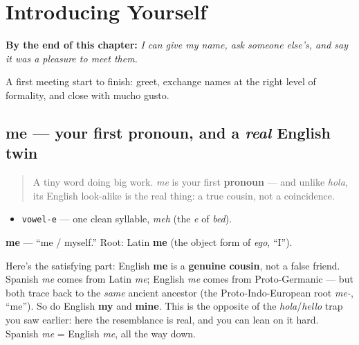 
\chapter{Introducing Yourself}
\label{ch:introductions}

\begin{chapteropening}
\textbf{By the end of this chapter:} \emph{I can give my name, ask someone else's, and say it was a pleasure to meet them.}

A first meeting start to finish: greet, exchange names at the right level of formality, and close with mucho gusto.
\end{chapteropening}

\section[me]{me — your first pronoun, and a \emph{real} English twin}

\label{lesson:ES-C03-me}



\begin{quote}
A tiny word doing big work. \emph{me} is your first \textbf{pronoun} — and unlike \emph{hola}, its English look-alike is the real thing: a true cousin, not a coincidence.
\end{quote}

\begin{sounds}
\begin{itemize}
\raggedright
  \item \texttt{vowel-e} — one clean syllable, \emph{meh} (the \emph{e} of \emph{bed}).
\end{itemize}
\end{sounds}

\begin{cousinweb}
\textbf{me} — \textquotedblleft{}me / myself.\textquotedblright{} Root: Latin \textbf{me} (the object form of \emph{ego}, \textquotedblleft{}I\textquotedblright{}).

Here's the satisfying part: English \textbf{me} is a \textbf{genuine cousin}, not a false friend. Spanish \emph{me} comes from Latin \emph{me}; English \emph{me} comes from Proto-Germanic — but both trace back to the \emph{same} ancient ancestor (the Proto-Indo-European root \emph{me-}, \textquotedblleft{}me\textquotedblright{}). So do English \textbf{my} and \textbf{mine}. This is the opposite of the \emph{hola}/\emph{hello} trap you saw earlier: here the resemblance is real, and you can lean on it hard. Spanish \emph{me} = English \emph{me}, all the way down.
\end{cousinweb}

